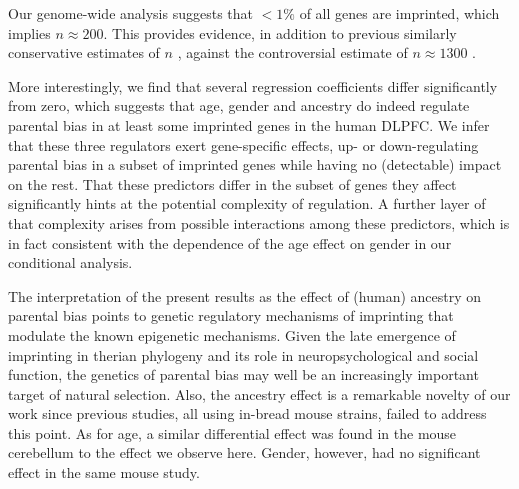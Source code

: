 \documentclass[letterpaper]{article}
\begin{document}
\begin{figure}[h]
\begin{center}
\end{center}
\caption{}
\label{fig:scheme}
\end{figure}

Our genome-wide analysis suggests that \(<1\%\) of all genes are imprinted,
which implies \(n\approx 200\).  This provides evidence, in addition to
previous similarly conservative estimates of \(n\)
\cite{Perez2015,DeVeale2012}, against the controversial estimate of \(n\approx
1300\) \cite{Gregg2010a}.

More interestingly, we find that several regression coefficients differ
significantly from zero, which suggests that age, gender and ancestry do
indeed regulate parental bias in at least some imprinted genes in the human
DLPFC.  We infer that these three regulators exert gene-specific effects, up-
or down-regulating parental bias in a subset of imprinted genes while having
no (detectable) impact on the rest.  That these predictors differ in the
subset of genes they affect significantly hints at the potential complexity of
regulation.  A further layer of that complexity arises from possible
interactions among these predictors, which is in fact consistent with the
dependence of the age effect on gender in our conditional analysis.

The interpretation of the present results as the effect of (human) ancestry on
parental bias points to genetic regulatory mechanisms of imprinting that
modulate the known epigenetic mechanisms.  Given the late emergence of
imprinting in therian phylogeny and its role in neuropsychological and social
function, the genetics of parental bias may well be an increasingly important
target of natural selection.  Also, the ancestry effect is a remarkable
novelty of our work since previous studies, all using in-bread mouse strains,
failed to address this point.  As for age, a similar differential effect was
found in the mouse cerebellum to the effect we observe here. Gender, however,
had no significant effect in the same mouse study.
\end{document}
